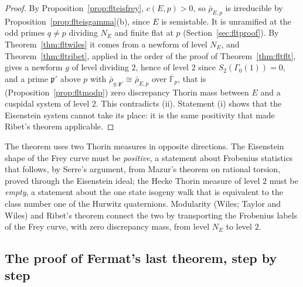 \begin{proof}
By Proposition~\ref{prop:flteisfrey}, $c(E,p)>0$, so $\bar\rho_{E,p}$ is irreducible by Proposition~\ref{prop:flteisgamma}(b), since $E$ is semistable. It is unramified at the odd primes $q\ne p$ dividing $N_E$ and finite flat at $p$ (Section~\ref{sec:fltproof}). By Theorem~\ref{thm:fltwiles} it comes from a newform of level $N_E$, and Theorem~\ref{thm:fltribet}, applied in the order of the proof of Theorem~\ref{thm:fltflt}, gives a newform $g$ of level dividing $2$, hence of level $2$ since $S_2(\Gamma_0(1))=0$, and a prime $\mathfrak p'$ above $p$ with $\bar\rho_{g,\mathfrak p'}\cong\bar\rho_{E,p}$ over $\overline{\mathbb F}_p$, that is (Proposition~\ref{prop:fltmodp}) zero discrepancy Thorin mass between $E$ and a cuspidal system of level $2$. This contradicts (ii). Statement (i) shows that the Eisenstein system cannot take its place: it is the same positivity that made Ribet's theorem applicable.
\end{proof}

The theorem uses two Thorin measures in opposite directions. The Eisenstein shape of the Frey curve must be \emph{positive}, a statement about Frobenius statistics that follows, by Serre's argument, from Mazur's theorem on rational torsion, proved through the Eisenstein ideal; the Hecke Thorin measure of level $2$ must be \emph{empty}, a statement about the one state isogeny walk that is equivalent to the class number one of the Hurwitz quaternions. Modularity (Wiles; Taylor and Wiles) and Ribet's theorem connect the two by transporting the Frobenius labels of the Frey curve, with zero discrepancy mass, from level $N_E$ to level $2$.

\subsection{The proof of Fermat's last theorem, step by step}

